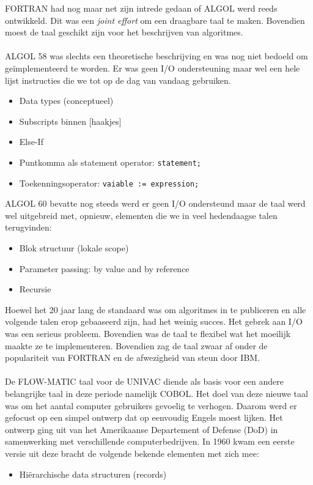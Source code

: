 \documentclass[../main.tex]{subfiles}
\begin{document}
\begin{solution}
FORTRAN had nog maar net zijn intrede gedaan of ALGOL werd reeds ontwikkeld.
Dit was een \emph{joint effort} om een draagbare taal te maken. Bovendien moest de taal geschikt zijn voor het beschrijven van algoritmes.
\\\\
ALGOL 58 was slechts een theoretische beschrijving en was nog niet bedoeld om ge\"implementeerd te worden.
Er was geen I/O ondersteuning maar wel een hele lijst instructies die we tot op de dag van vandaag gebruiken.
\begin{itemize}
		\item Data types (conceptueel)
		\item Subscripts binnen [haakjes]
		\item Else-If
		\item Puntkomma als statement operator: \texttt{statement;}
		\item Toekenningsoperator: \texttt{vaiable := expression;}
\end{itemize}
ALGOL 60 bevatte nog steeds werd er geen I/O ondersteund maar de taal werd wel uitgebreid met, opnieuw, elementen die we in veel hedendaagse talen terugvinden:
\begin{itemize}
		\item Blok structuur (lokale scope)
		\item Parameter passing: by value and by reference
		\item Recursie
\end{itemize}
Hoewel het  20 jaar lang de standaard was om algoritmes in te publiceren en alle volgende talen erop gebaaseerd zijn, had het weinig succes. Het gebrek aan I/O was een serieus probleem. Bovendien was de taal te flexibel wat het moeilijk maakte ze te implementeren. Bovendien zag de taal zwaar af onder de populariteit van FORTRAN en de afwezigheid van steun door IBM.
\\\\
De FLOW-MATIC taal voor de UNIVAC diende als basis voor een andere belangrijke taal in deze periode namelijk COBOL.
Het doel van deze nieuwe taal was om het aantal computer gebruikers gevoelig te verhogen.
Daarom werd er gefocust op een simpel ontwerp dat op eenvoudig Engels moest lijken.
Het ontwerp ging uit van het Amerikaanse Departement of Defense (DoD) in samenwerking met verschillende computerbedrijven.
In 1960 kwam een eerste versie uit deze bracht de volgende bekende elementen met zich mee:
\begin{itemize}
		\item Hi\"erarchische data structuren (records)

\end{itemize}
\end{solution}
\end{document}
